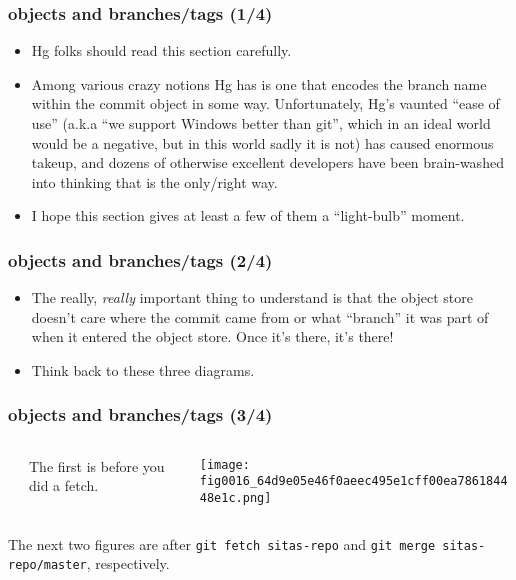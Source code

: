 \documentclass[presentation]{beamer}
\begin{document}
\begin{frame}
\frametitle{objects and branches/tags (1/4)}
\label{sec-7-3}


\begin{itemize}
\item Hg folks should read this section carefully.
\item Among various crazy notions Hg
  has is one that encodes the branch name within the commit object in some way.
  Unfortunately, Hg's vaunted ``ease of use'' (a.k.a ``we support Windows better
  than git'', which in an ideal world would be a negative, but in this world
  sadly it is not) has caused enormous takeup, and dozens of otherwise excellent
  developers have been brain-washed into thinking that is the only/right way.
\item I hope this section gives at least a few of them a ``light-bulb'' moment.
\end{itemize}
\end{frame}
\begin{frame}
\frametitle{objects and branches/tags (2/4)}
\label{sec-7-4}

\begin{itemize}
\item The really, \emph{really} important thing to understand is that the object store
  doesn't care where the commit came from or what ``branch'' it was part of when
  it entered the object store.  Once it's there, it's there!
\item Think back to these three diagrams.
\end{itemize}
\end{frame}
\begin{frame}
\frametitle{objects and branches/tags (3/4)}
\label{sec-7-5}
\begin{columns} %
\label{sec-7-5-1}
\begin{column}{0.4\textwidth}
\label{sec-7-5-1-1}




The first is before you did a fetch.
\end{column}
\begin{column}{0.6\textwidth}
\label{sec-7-5-1-2}


\texttt{[image: fig0016\_64d9e05e46f0aeec495e1cff00ea786184448e1c.png]}
\end{column}
\end{columns}
\label{sec-7-5-2}


The next two figures are after \texttt{git fetch sitas-repo} and \texttt{git merge sitas-repo/master}, respectively.  
\end{frame}
\end{document}
